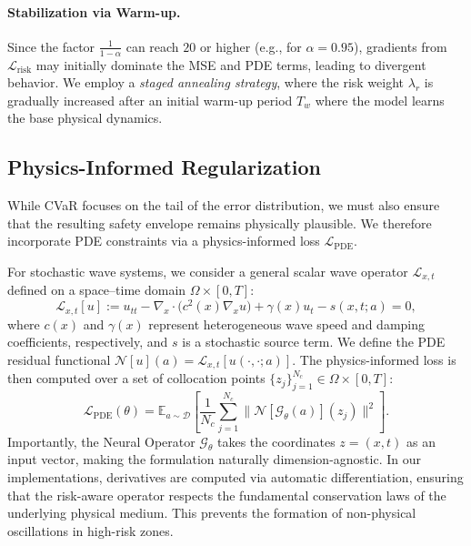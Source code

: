 \documentclass{article}
\newcommand{\E}{\mathbb{E}}
\newcommand{\Lrisk}{\mathcal{L}_{\text{risk}}}
\theoremstyle{plain}
\theoremstyle{definition}
\theoremstyle{remark}
\begin{document}
\paragraph{Stabilization via Warm-up.}
Since the factor $\frac{1}{1-\alpha}$ can reach $20$ or higher (e.g., for $\alpha=0.95$), gradients from $\Lrisk$ may initially dominate the MSE and PDE terms, leading to divergent behavior. We employ a \textit{staged annealing strategy}, where the risk weight $\lambda_r$ is gradually increased after an initial warm-up period $T_w$ where the model learns the base physical dynamics.

\subsection{Physics-Informed Regularization}
\label{sec:physics}

While CVaR focuses on the tail of the error distribution, we must also ensure that the resulting safety envelope remains physically plausible. We therefore incorporate PDE constraints via a physics-informed loss $\mathcal{L}_{\text{PDE}}$.

For stochastic wave systems, we consider a general scalar wave operator $\mathcal{L}_{x,t}$ defined on a space--time domain $\Omega \times [0,T]$:
\begin{equation}
    \mathcal{L}_{x,t}[u]
    :=
    u_{tt}
    - \nabla_x \cdot \big( c^2(x) \nabla_x u \big)
    + \gamma(x) u_t
    - s(x,t;a)
    = 0,
    \label{eq:general_pde}
\end{equation}
where $c(x)$ and $\gamma(x)$ represent heterogeneous wave speed and damping coefficients, respectively, and $s$ is a stochastic source term. We define the PDE residual functional $\mathcal{N}[u](a) = \mathcal{L}_{x,t}[u(\cdot,\cdot;a)]$. The physics-informed loss is then computed over a set of collocation points $\{z_j\}_{j=1}^{N_c} \in \Omega \times [0,T]$:
\begin{equation}
    \mathcal{L}_{\text{PDE}}(\theta)
    =
    \E_{a \sim \mathcal{D}} \left[ \frac{1}{N_c} \sum_{j=1}^{N_c} \big\| \mathcal{N}[\mathcal{G}_\theta(a)](z_j) \big\|^2 \right].
\end{equation}
Importantly, the Neural Operator $\mathcal{G}_\theta$ takes the coordinates $z=(x,t)$ as an input vector, making the formulation naturally dimension-agnostic. In our implementations, derivatives are computed via automatic differentiation, ensuring that the risk-aware operator respects the fundamental conservation laws of the underlying physical medium. This prevents the formation of non-physical oscillations in high-risk zones.
\end{document}

